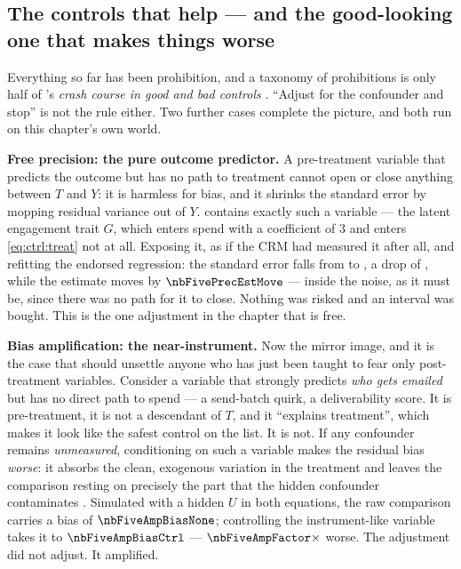 \subsection*{The controls that help --- and the good-looking one that makes things worse}
\label{sec:ctrl:good}

Everything so far has been prohibition, and a taxonomy of prohibitions is only half of
\citeauthor{cinelli2022}'s \emph{crash course in good and bad controls} \citep{cinelli2022}. ``Adjust
for the confounder and stop'' is not the rule either. Two further cases complete the picture, and
both run on this chapter's own world.

\medskip\noindent
\textbf{Free precision: the pure outcome predictor.} A pre-treatment variable that predicts the
outcome but has no path to treatment cannot open or close anything between $T$ and $Y$: it is
harmless for bias, and it shrinks the standard error by mopping residual variance out of $Y$.
 contains exactly such a variable --- the latent engagement trait $G$, which
enters spend with a coefficient of $3$ and enters \cref{eq:ctrl:treat} not at all. Exposing it, as
if the CRM had measured it after all, and refitting the endorsed regression: the standard error
falls from \eur{\nbFivePrecBaseSe} to \eur{\nbFivePrecPlusSe}, a drop of \pc{\nbFivePrecSeDropPct},
while the estimate moves by $\nbFivePrecEstMove$ --- inside the noise, as it must be, since there
was no path for it to close. Nothing was risked and an interval was bought. This is the one
adjustment in the chapter that is free.

\medskip\noindent
\textbf{Bias amplification: the near-instrument.} Now the mirror image, and it is the case that
should unsettle anyone who has just been taught to fear only post-treatment variables. Consider a
variable that strongly predicts \emph{who gets emailed} but has no direct path to spend --- a
send-batch quirk, a deliverability score. It is pre-treatment, it is not a descendant of $T$, and it
``explains treatment'', which makes it look like the safest control on the list. It is not. If any
confounder remains \emph{unmeasured}, conditioning on such a variable makes the residual bias
\emph{worse}: it absorbs the clean, exogenous variation in the treatment and leaves the comparison
resting on precisely the part that the hidden confounder contaminates \citep{ding2015}. Simulated
with a hidden $U$ in both equations, the raw comparison carries a bias of $\nbFiveAmpBiasNone$;
controlling the instrument-like variable takes it to $\nbFiveAmpBiasCtrl$ ---
$\nbFiveAmpFactor\times$ worse. The adjustment did not adjust. It amplified.

